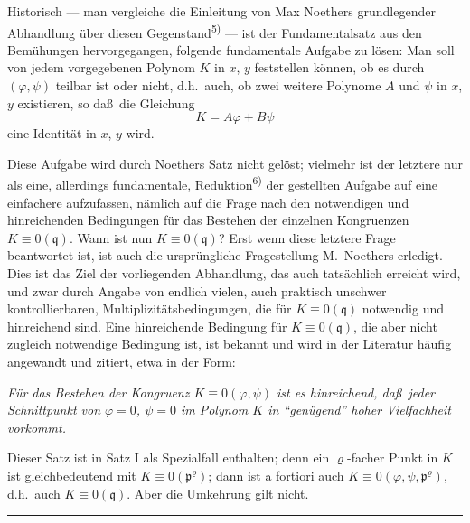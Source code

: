 \documentclass[12pt,a4paper]{article}
\theoremstyle{plain}
\theoremstyle{definition}
\theoremstyle{remark}
\begin{document}
Historisch --- man vergleiche die Einleitung von Max Noethers
grundlegender Abhandlung \"uber diesen
Gegenstand\textsuperscript{5)} --- ist der Fundamentalsatz aus den
Bem\"uhungen hervorgegangen, folgende fundamentale Aufgabe zu
l\"osen: Man soll von jedem vorgegebenen Polynom $K$ in $x$, $y$
feststellen k\"onnen, ob es durch $(\varphi, \psi)$ teilbar ist oder nicht,
d.h.\ auch, ob zwei weitere Polynome $A$ und $\psi$ in $x$, $y$
existieren, so da\ss\ die Gleichung
\[
K = A\varphi + B\psi
\]
eine Identit\"at in $x$, $y$ wird.

Diese Aufgabe wird durch Noethers Satz nicht gel\"ost; vielmehr ist
der letztere nur als eine, allerdings fundamentale,
Reduktion\textsuperscript{6)} der gestellten Aufgabe auf eine einfachere
aufzufassen, n\"amlich auf die Frage nach den notwendigen und
hinreichenden Bedingungen f\"ur das Bestehen der einzelnen
Kongruenzen $K \equiv 0(\mathfrak{q})$. Wann ist nun $K \equiv 0(\mathfrak{q})$?
Erst wenn diese letztere Frage beantwortet ist, ist auch die
urspr\"ungliche Fragestellung M.\ Noethers erledigt. Dies ist das Ziel
der vorliegenden Abhandlung, das auch tats\"achlich erreicht wird,
und zwar durch Angabe von endlich vielen, auch praktisch unschwer
kontrollierbaren, Multiplizit\"atsbedingungen, die f\"ur
$K \equiv 0(\mathfrak{q})$ notwendig und hinreichend sind. Eine hinreichende
Bedingung f\"ur $K \equiv 0(\mathfrak{q})$, die aber nicht zugleich notwendige
Bedingung ist, ist bekannt und wird in der Literatur h\"aufig
angewandt und zitiert, etwa in der Form:

\smallskip
\textit{F\"ur das Bestehen der Kongruenz $K \equiv 0(\varphi, \psi)$ ist es
hinreichend, da\ss\ jeder Schnittpunkt von $\varphi = 0$, $\psi = 0$ im
Polynom $K$ in ``gen\"ugend'' hoher Vielfachheit vorkommt.}

\smallskip
Dieser Satz ist in Satz I als Spezialfall enthalten; denn ein
$\varrho$-facher Punkt in $K$ ist gleichbedeutend mit $K \equiv 0(\mathfrak{p}^{\varrho})$;
dann ist a fortiori auch $K \equiv 0(\varphi, \psi, \mathfrak{p}^{\varrho})$,
d.h.\ auch $K \equiv 0(\mathfrak{q})$. Aber die Umkehrung gilt nicht.

\vspace{0.5em}
\noindent\rule{\textwidth}{0.4pt}
\vspace{0.3em}
\end{document}
